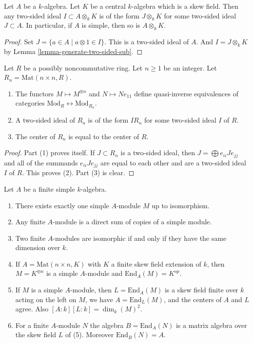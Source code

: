 \begin{lemma}
\label{lemma-generate-two-sided-ideal}
Let $A$ be a $k$-algebra. Let $K$ be a central $k$-algebra
which is a skew field. Then any two-sided ideal $I \subset A \otimes_k K$
is of the form $J \otimes_k K$ for some two-sided ideal $J \subset A$.
In particular, if $A$ is simple, then so is $A \otimes_k K$.
\end{lemma}

\begin{proof}
Set $J = \{a \in A \mid a \otimes 1 \in I\}$. This is a two-sided ideal
of $A$. And $I = J \otimes_k K$ by
Lemma \ref{lemma-generate-two-sided-sub}.
\end{proof}

\begin{lemma}
\label{lemma-matrix-algebras}
Let $R$ be a possibly noncommutative ring. Let $n \geq 1$ be an integer.
Let $R_n = \text{Mat}(n \times n, R)$.
\begin{enumerate}
\item The functors $M \mapsto M^{\oplus n}$ and
$N \mapsto Ne_{11}$ define quasi-inverse equivalences of categories
$\text{Mod}_R \leftrightarrow \text{Mod}_{R_n}$.
\item A two-sided ideal of $R_n$ is of the form $IR_n$ for some
two-sided ideal $I$ of $R$.
\item The center of $R_n$ is equal to the center of $R$.
\end{enumerate}
\end{lemma}

\begin{proof}
Part (1) proves itself. If $J \subset R_n$ is a two-sided ideal, then
$J = \bigoplus e_{ii}Je_{jj}$ and all of the summands $e_{ii}Je_{jj}$ are
equal to each other and are a two-sided ideal $I$ of $R$. This proves (2).
Part (3) is clear.
\end{proof}

\begin{lemma}
\label{lemma-simple-module-unique}
Let $A$ be a finite simple $k$-algebra.
\begin{enumerate}
\item There exists exactly one simple $A$-module $M$ up to isomorphism.
\item Any finite $A$-module is a direct sum of copies of a simple module.
\item Two finite $A$-modules are isomorphic if and only if they
have the same dimension over $k$.
\item If $A = \text{Mat}(n \times n, K)$ with $K$ a finite skew field
extension of $k$, then $M = K^{\oplus n}$ is a simple $A$-module and
$\text{End}_A(M) = K^{op}$.
\item If $M$ is a simple $A$-module, then $L = \text{End}_A(M)$
is a skew field finite over $k$ acting on the left on $M$, we have
$A = \text{End}_L(M)$, and the centers of $A$ and $L$ agree.
Also $[A : k] [L : k] = \dim_k(M)^2$.
\item For a finite $A$-module $N$ the algebra $B = \text{End}_A(N)$ is a
matrix algebra over the skew field $L$ of (5). Moreover $\text{End}_B(N) = A$.
\end{enumerate}
\end{lemma}


